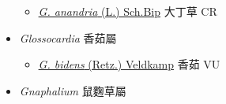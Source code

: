 \begin{itemize}
  \begin{itemize}
        \item[] \href{http://www.theplantlist.org/tpl1.1/search?q=Gerbera+anandria}{\textit{G. anandria} (L.) Sch.Bip}   大丁草 CR
  \end{itemize}
 \item[] \textit{Glossocardia} 香茹屬
                    
  \begin{itemize}
        \item[] \href{http://www.theplantlist.org/tpl1.1/search?q=Glossocardia+bidens}{\textit{G. bidens} (Retz.) Veldkamp}   香茹 VU
  \end{itemize}
 \item[] \textit{Gnaphalium} 鼠麴草屬
                    

\end{itemize}
